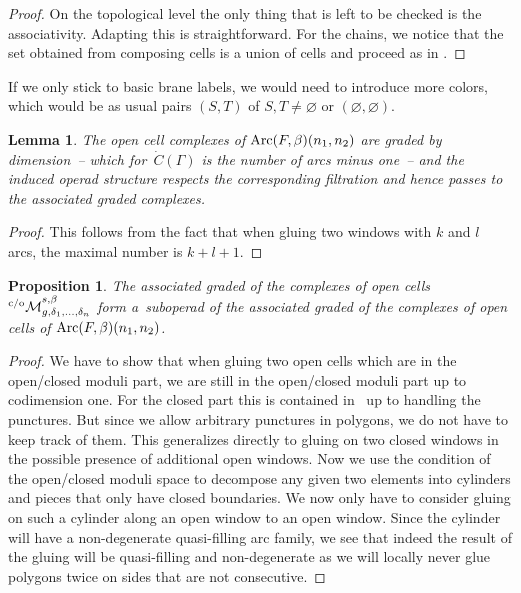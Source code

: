 \documentclass[pdftex]{sigma}
\newtheorem{lem}[thm]{Lemma}
\newtheorem{prop}[thm]{Proposition}
\def\Mco{{{}^{\rm c/o}\mathcal M}_{g,\delta_1,\dots,\delta_n}^{s,\beta}}
\begin{document}
\begin{proof}
On the topological level the only thing that is left to be checked is the associativity. Adapting \cite{KLP} this is straightforward.
For the chains, we notice that the set obtained from composing cells is a union of cells and proceed
as in \cite{hoch1}.
\end{proof}

If we only stick to basic brane labels, we would need to introduce more colors, which would be
as usual pairs $(S,T)$ of $S,T\neq \varnothing$ or $(\varnothing,\varnothing)$.

\begin{lem}
The open cell complexes of ${\rm Arc}(F,\beta)(n_1,n_2)$  are graded by dimension~-- which for~$\dot C(\Gamma)$ is the number of arcs minus one~-- and
the induced operad structure respects the corresponding filtration and hence passes to the associated
graded complexes.
\end{lem}
\begin{proof}
This follows from the fact that when gluing two windows with $k$ and $l$ arcs, the maximal
number is $k+l+1$.
\end{proof}

\begin{prop}
The associated graded of the complexes of open cells  $\Mco$ form a~suboperad of
the associated graded of the complexes of open cells of ${\rm Arc}(F,\beta)(n_1,n_2)$.
\end{prop}

\begin{proof}
We have to show that when gluing two  open cells which are in the open/closed moduli part,
we are still in the open/closed moduli part up to codimension one. For the closed part this is contained in~\cite{hoch1} up to handling the punctures. But since we allow arbitrary punctures in polygons, we do not have to keep track of them. This generalizes directly to gluing on two closed windows in the possible presence of additional open windows. Now we use the condition of the open/closed moduli space to decompose
any given two elements into cylinders and pieces that only have closed boundaries.
We now only have to consider gluing on such a cylinder along an open window to an open window.
Since the cylinder will have a non-degenerate quasi-f\/illing arc family, we see that indeed the
result of the gluing will be quasi-f\/illing and non-degenerate as we will locally never glue
polygons twice on sides that are not consecutive.
\end{proof}
\end{document}
